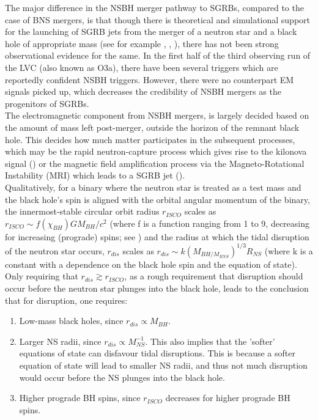     The major difference in the NSBH merger pathway to SGRBs, compared to the case of
    BNS mergers, is that though there is theoretical and simulational support for the
    launching of SGRB jets from the merger of a neutron star and a black hole of
    appropriate mass (see for example \cite{ruiz_2020}, \cite{shibata_2019},
    \cite{foucart_2020}), there has not been strong observational evidence for the same.
    In the first half of the third observing run of the LVC (also known as O3a), there
    have been several triggers which are reportedly confident NSBH triggers. However,
    there were no counterpart EM signals picked up, which decreases the credibility of
    NSBH mergers as the progenitors of SGRBs.\\
    The electromagnetic component from NSBH mergers, is largely decided based on the
    amount of mass left post-merger, outside the horizon of the remnant black hole.
    This decides how much matter participates in the subsequent processes, which may be
    the rapid neutron-capture process which gives rise to the kilonova signal
    (\cite{metzger_2019}) or the magnetic field amplification process via the
    Magneto-Rotational Instability (MRI) which leads to a SGRB jet
    (\cite{postnov_2019}).\\
    Qualitatively, for a binary where the neutron star is treated as a test mass and the
    black hole's spin is aligned with the orbital angular momentum of the binary, the
    innermost-stable circular orbit radius $r_{ISCO}$ scales as $r_{ISCO} \sim
    f(\chi_{BH}) G M_{BH}/c^2$ (where f is a function ranging from 1 to 9, decreasing
    for increasing (prograde) spins; see \cite{bardeen_1972}) and the radius at which
    the tidal disruption of the neutron star occurs, $r_{dis}$ scales as $r_{dis} \sim k
    (M_{BH/M_{BNS}})^{1/3} R_{NS}$ (where k is a constant with a dependence on the black
    hole spin and the equation of state). Only requiring that $r_{dis} \gtrsim
    r_{ISCO}$, as a rough requirement that disruption should occur before the neutron
    star plunges into the black hole, leads to the conclusion that for disruption, one
    requires:

    \begin{enumerate}[label=\alph*.)]

        \item Low-mass black holes, since $r_{dis} \propto M_{BH}$.

        \item Larger NS radii, since $r_{dis} \propto M_{NS}^{-1}$. This also implies
            that the 'softer' equations of state can disfavour tidal disruptions. This
            is because a softer equation of state will lead to smaller NS radii, and
            thus not much disruption would occur before the NS plunges into the black
            hole.

        \item Higher prograde BH spins, since $r_{ISCO}$ decreases for higher prograde
            BH spins.

    \end{enumerate}

